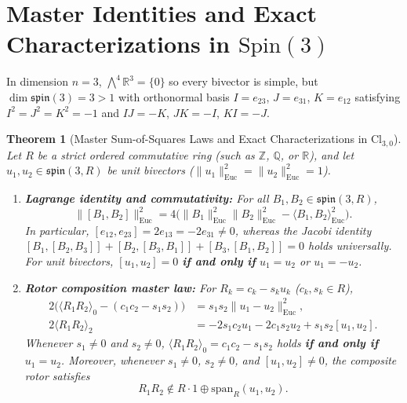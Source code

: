 \documentclass[11pt]{article}
\newtheorem{theorem}{Theorem}[section]
\theoremstyle{definition}
\newcommand{\Cl}{\mathrm{Cl}}
\newcommand{\Spin}{\mathrm{Spin}}
\newcommand{\spinlie}{\mathfrak{spin}}
\newcommand{\Euc}{\mathrm{Euc}}
\newcommand{\grade}[2]{\langle #1 \rangle_{#2}}
\begin{document}
\section{Master Identities and Exact Characterizations in \texorpdfstring{$\Spin(3)$}{Spin(3)}}

In dimension $n = 3$, $\bigwedge^4 \mathbb{R}^3 = \{0\}$ so every bivector is simple, but
$\dim \spinlie(3) = 3 > 1$ with orthonormal basis $I = e_{23}$, $J = e_{31}$, $K = e_{12}$
satisfying $I^2 = J^2 = K^2 = -1$ and $I J = -K$, $J K = -I$, $K I = -J$.

\begin{theorem}[Master Sum-of-Squares Laws and Exact Characterizations in $\Cl_{3,0}$]\label{thm:spin3-iff}
Let $R$ be a strict ordered commutative ring (such as $\mathbb{Z}$, $\mathbb{Q}$, or
$\mathbb{R}$), and let $u_1, u_2 \in \spinlie(3, R)$ be unit bivectors
($\|u_1\|_{\Euc}^2 = \|u_2\|_{\Euc}^2 = 1$).
\begin{enumerate}
  \item \textbf{Lagrange identity and commutativity:} For all $B_1, B_2 \in \spinlie(3, R)$,
    \begin{equation}\label{eq:lagrange}
      \|[B_1, B_2]\|_{\Euc}^2
      = 4\bigl(\|B_1\|_{\Euc}^2 \|B_2\|_{\Euc}^2 - \langle B_1, B_2 \rangle_{\Euc}^2\bigr).
    \end{equation}
    In particular, $[e_{12}, e_{23}] = 2 e_{13} = -2 e_{31} \neq 0$, whereas the Jacobi identity
    $[B_1, [B_2, B_3]] + [B_2, [B_3, B_1]] + [B_3, [B_1, B_2]] = 0$ holds universally. For unit
    bivectors, $[u_1, u_2] = 0$ \textbf{if and only if} $u_1 = u_2$ or $u_1 = -u_2$.
  \item \textbf{Rotor composition master law:} For $R_k = c_k - s_k u_k$ ($c_k, s_k \in R$),
    \begin{align}
      2\bigl(\grade{R_1 R_2}{0} - (c_1 c_2 - s_1 s_2)\bigr)
      &= s_1 s_2 \|u_1 - u_2\|_{\Euc}^2, \label{eq:master-scalar}\\
      2\grade{R_1 R_2}{2}
      &= -2 s_1 c_2 u_1 - 2 c_1 s_2 u_2 + s_1 s_2 [u_1, u_2]. \label{eq:master-grade2}
    \end{align}
    Whenever $s_1 \neq 0$ and $s_2 \neq 0$, $\grade{R_1 R_2}{0} = c_1 c_2 - s_1 s_2$ holds
    \textbf{if and only if} $u_1 = u_2$. Moreover, whenever $s_1 \neq 0$, $s_2 \neq 0$, and
    $[u_1, u_2] \neq 0$, the composite rotor satisfies
    \begin{equation}\label{eq:subalg-obstruction}
      R_1 R_2 \notin R \cdot 1 \oplus \mathrm{span}_R(u_1, u_2).
    \end{equation}

\end{enumerate}
\end{theorem}
\end{document}
